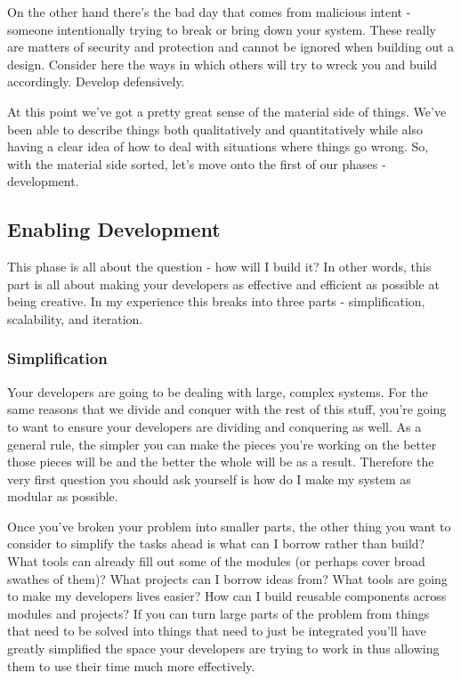 \documentclass[10pt,a5paper]{book}
\begin{document}
On the other hand there's the bad day that comes from malicious intent - someone intentionally trying to break or bring down your system. These really are matters of security and protection and cannot be ignored when building out a design. Consider here the ways in which others will try to wreck you and build accordingly. Develop defensively. 

At this point we've got a pretty great sense of the material side of things. We've been able to describe things both qualitatively and quantitatively while also having a clear idea of how to deal with situations where things go wrong. So, with the material side sorted, let's move onto the first of our phases - development.

\subsection{Enabling Development}
This phase is all about the question - how will I build it? In other words, this part is all about making your developers as effective and efficient as possible at being creative. In my experience this breaks into three parts - simplification, scalability, and iteration. 

\subsubsection{Simplification}
Your developers are going to be dealing with large, complex systems. For the same reasons that we divide and conquer with the rest of this stuff, you're going to want to ensure your developers are dividing and conquering as well. As a general rule, the simpler you can make the pieces you're working on the better those pieces will be and the better the whole will be as a result. Therefore the very first question you should ask yourself is how do I make my system as modular as possible.  

Once you've broken your problem into smaller parts, the other thing you want to consider to simplify the tasks ahead is what can I borrow rather than build? What tools can already fill out some of the modules (or perhaps cover broad swathes of them)? What projects can I borrow ideas from? What tools are going to make my developers lives easier? How can I build reusable components across modules and projects? If you can turn large parts of the problem from things that need to be solved into things that need to just be integrated you'll have greatly simplified the space your developers are trying to work in thus allowing them to use their time much more effectively. 
\end{document}
